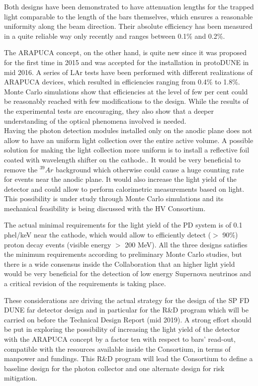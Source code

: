 Both designs have been demonstrated to have attenuation lengths for the 
trapped light comparable to the length of the bars themselves, which ensures a 
reasonable uniformity along the beam direction. Their absolute efficiency has 
been measured in a quite reliable way only recently and ranges between 0.1\% and
0.2\%.
 
The ARAPUCA concept, on the other hand, is quite new since it was proposed for 
the first time in 2015 and was accepted for the installation in protoDUNE in 
mid 2016. A series of LAr tests have been performed with different 
realizations of ARAPUCA devices, which resulted in efficiencies ranging from 
0.4\% to 1.8\%. Monte Carlo simulations show that efficiencies at the level of 
few per cent could be reasonably reached with few modifications to the design. 
While the results of the experimental tests are encouraging, they also show 
that a deeper understanding of the optical phenomena involved is needed.\\ 


Having the photon detection modules installed only on the anodic plane does 
not allow to have an uniform light collection over the entire active volume. A
possible solution 
for making the light collection more uniform is to install a 
reflective foil coated with wavelength shifter on the cathode.. It would be very
beneficial to remove the $^{39}Ar$ 
background which otherwise could cause a huge counting rate for events near 
the anodic plane. It would also increase the light yield of the detector and 
could allow to perform calorimetric measurements based on light.  This 
possibility is under study through Monte Carlo simulations and its mechanical
feasibility is being discussed with the HV Consortium.

The actual minimal requirements for the light yield of the PD system is of 0.1 
phel/keV near the cathode, which would allow to efficiently  detect ($>$ 90\%) 
proton decay events (visible energy $>$ 200 MeV). All the three designs 
satisfies the minimum requirements according to preliminary Monte Carlo 
studies, but there is a wide consensus inside the Collaboration that an higher 
light yield would be very beneficial for the detection of low energy Supernova 
neutrinos and a critical revision of the requirements is taking place.

These considerations are driving the actual strategy for the design of the SP 
FD DUNE far detector design and in particular for the R\&D program which will 
be carried on before the Technical Design Report (mid 2019). A strong effort 
should be put in exploring the possibility of increasing the light yield of the 
detector with the ARAPUCA concept by a factor ten with respect to bars' 
read-out, compatible with the resources available inside the Consortium, in 
terms of manpower and fundings. This R\&D program will lead the Consortium to 
define a baseline design for the photon collector and one alternate design for risk
mitigation.  

